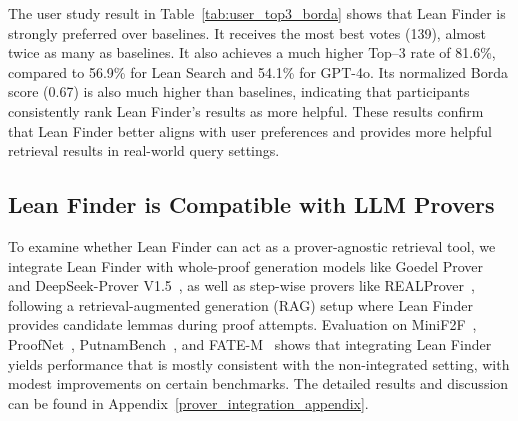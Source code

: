 \documentclass{article} %
\begin{document}
The user study result in Table~\ref{tab:user_top3_borda} shows that Lean Finder is strongly preferred over baselines. It receives the most best votes (139), almost twice as many as baselines. It also achieves a much higher Top–3 rate of 81.6\%, compared to 56.9\% for Lean Search and 54.1\% for GPT-4o. Its normalized Borda score (0.67) is also much higher than baselines, indicating that participants consistently rank Lean Finder’s results as more helpful. These results confirm that Lean Finder better aligns with user preferences and provides more helpful retrieval results in real-world query settings.

\begin{table}[h!]
\captionsetup{font=small}
\caption{User ranking outcomes over 3 retrieval models, where $n_1(m)$, $n_2(m)$, $n_3(m)$ refers to the counts of 1st/2nd/3rd place votes for model \(m\).
Best results are in \textbf{bold}.}
\vspace{-1em}
\label{tab:user_top3_borda}
\centering
{}
\vspace{-1em}
\end{table}


\subsection{Lean Finder is Compatible with LLM Provers}
\label{sec:prover_integration}

To examine whether Lean Finder can act as a prover-agnostic retrieval tool, we integrate Lean Finder with whole-proof generation models like Goedel Prover~\citep{lin2025goedel} and DeepSeek-Prover V1.5~\citep{xin2024deepseekv15}, as well as step-wise provers like REALProver~\citep{shen2025real}, following a retrieval-augmented generation (RAG) setup where Lean Finder provides candidate lemmas during proof attempts.
Evaluation on MiniF2F~\citep{minif2f}, ProofNet~\citep{proofnet}, PutnamBench~\citep{putnam}, and FATE-M~\citep{shen2025real} shows that integrating Lean Finder yields performance that is mostly consistent with the non-integrated setting, with modest improvements on certain benchmarks.
The detailed results and discussion can be found in Appendix~\ref{prover_integration_appendix}.
\end{document}
